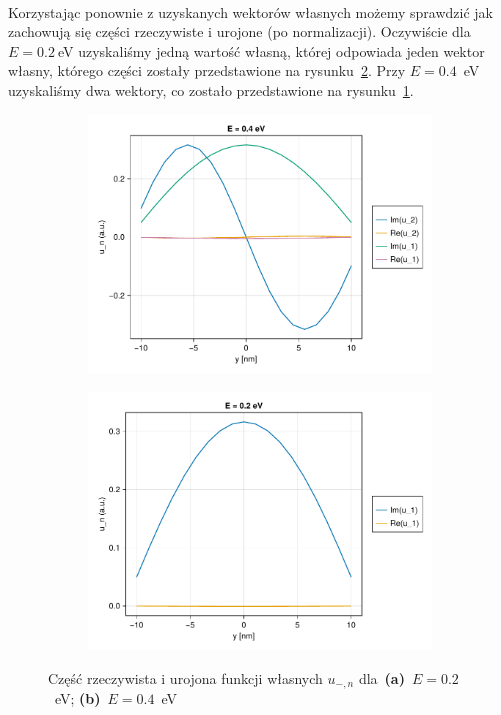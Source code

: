 \documentclass{article}
\begin{document}
\\
Korzystając ponownie z uzyskanych wektorów własnych możemy sprawdzić jak zachowują się części rzeczywiste i urojone (po normalizacji).
Oczywiście dla $E = 0.2~$eV uzyskaliśmy jedną wartość własną, której odpowiada jeden wektor własny, którego części zostały przedstawione na rysunku~\ref{fig:real_imag_02}.
Przy $E = 0.4$~eV uzyskaliśmy dwa wektory, co zostało przedstawione na rysunku~\ref{fig:real_imag_04}.
\begin{figure}[htp!]
    \centering
\begin{subfigure}{.495\textwidth}
\includegraphics[width=1.0\textwidth]{ex2_imag_real_energy04.pdf}
    \caption{}
    \label{fig:real_imag_04}
\end{subfigure}
\begin{subfigure}{.495\textwidth}
\includegraphics[width=1.0\textwidth]{ex2_imag_real_values_energy02.pdf}
    \caption{}
    \label{fig:real_imag_02}
\end{subfigure}
\caption{Część rzeczywista i urojona funkcji własnych $u_{-, n}$ dla~\textbf{(a)}~$E = 0.2$~eV; \textbf{(b)}~$E = 0.4$~eV}
\label{fig:ex2_real_imag0204}
\end{figure}
\end{document}
